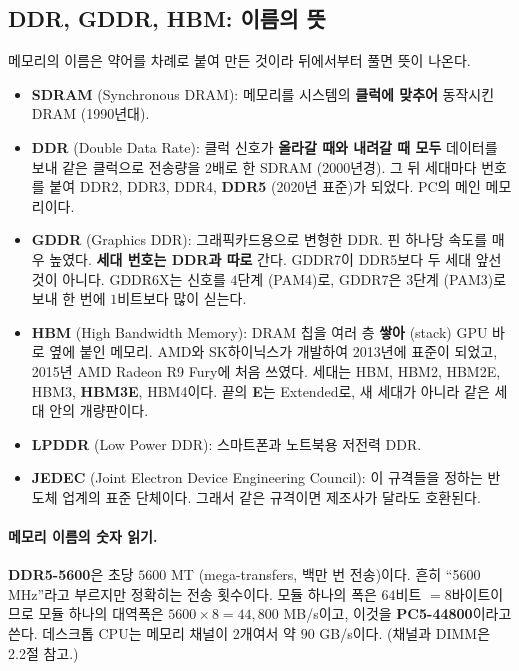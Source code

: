 \documentclass[11pt,a4paper]{article}
\begin{document}
\subsection{DDR, GDDR, HBM: 이름의 뜻}\label{sec:ddr}

메모리의 이름은 약어를 차례로 붙여 만든 것이라 뒤에서부터 풀면 뜻이 나온다.

\begin{itemize}[leftmargin=1.5em]
\item \textbf{SDRAM} (Synchronous DRAM): 메모리를 시스템의 \textbf{클럭에 맞추어} 동작시킨 DRAM (1990년대).
\item \textbf{DDR} (Double Data Rate): 클럭 신호가 \textbf{올라갈 때와 내려갈 때 모두} 데이터를 보내 같은 클럭으로 전송량을 $2$배로 한 SDRAM (2000년경).
그 뒤 세대마다 번호를 붙여 DDR2, DDR3, DDR4, \textbf{DDR5} (2020년 표준)가 되었다. PC의 메인 메모리이다.
\item \textbf{GDDR} (Graphics DDR): 그래픽카드용으로 변형한 DDR. 핀 하나당 속도를 매우 높였다.
\textbf{세대 번호는 DDR과 따로} 간다. GDDR7이 DDR5보다 두 세대 앞선 것이 아니다.
GDDR6X는 신호를 $4$단계 (PAM4)로, GDDR7은 $3$단계 (PAM3)로 보내 한 번에 $1$비트보다 많이 싣는다.
\item \textbf{HBM} (High Bandwidth Memory): DRAM 칩을 여러 층 \textbf{쌓아} (stack) GPU 바로 옆에 붙인 메모리.
AMD와 SK하이닉스가 개발하여 2013년에 표준이 되었고, 2015년 AMD Radeon R9 Fury에 처음 쓰였다.
세대는 HBM, HBM2, HBM2E, HBM3, \textbf{HBM3E}, HBM4이다. 끝의 \textbf{E}는 Extended로, 새 세대가 아니라 같은 세대 안의 개량판이다.
\item \textbf{LPDDR} (Low Power DDR): 스마트폰과 노트북용 저전력 DDR.
\item \textbf{JEDEC} (Joint Electron Device Engineering Council): 이 규격들을 정하는 반도체 업계의 표준 단체이다. 그래서 같은 규격이면 제조사가 달라도 호환된다.
\end{itemize}

\paragraph{메모리 이름의 숫자 읽기.}
\textbf{DDR5-5600}은 초당 $5600$ MT (mega-transfers, 백만 번 전송)이다. 흔히 ``5600 MHz''라고 부르지만 정확히는 전송 횟수이다.
모듈 하나의 폭은 $64$비트 $=8$바이트이므로 모듈 하나의 대역폭은 $5600\times8=44{,}800$ MB/s이고, 이것을 \textbf{PC5-44800}이라고 쓴다.
데스크톱 CPU는 메모리 채널이 $2$개여서 약 $90$ GB/s이다.
(채널과 DIMM은 2.2절 참고.)
\end{document}
